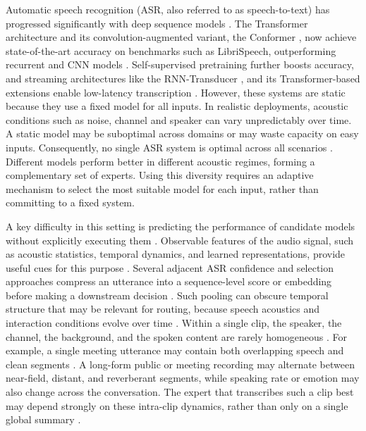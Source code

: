 \documentclass[journal]{IEEEtran}
\begin{document}
Automatic speech recognition (ASR, also referred to as speech-to-text) has progressed significantly with deep sequence models \cite{hinton_deepn,dahl_context,deng_conf}. The Transformer architecture \cite{vaswani2017attention} and its convolution-augmented variant, the Conformer \cite{gulati2020conformer}, now achieve state-of-the-art accuracy on benchmarks such as LibriSpeech, outperforming recurrent and CNN models \cite{deng_conf,bigssl}. Self-supervised pretraining \cite{baevski2020wav2vec,hsu2021hubert,chen2022wavlm} further boosts accuracy, and streaming architectures like the RNN-Transducer \cite{Graves2012SequenceTW}, and its Transformer-based extensions enable low-latency transcription \cite{gong_advanced,lee_mle}. However, these systems are static because they use a fixed model for all inputs. In realistic deployments, acoustic conditions such as noise, channel and speaker can vary unpredictably over time. A static model may be suboptimal across domains or may waste capacity on easy inputs. Consequently, no single ASR system is optimal across all scenarios \cite{li2014overviewrobust,cornell23_chime,cornell24_chime}. Different models perform better in different acoustic regimes, forming a complementary set of experts. Using this diversity requires an adaptive mechanism to select the most suitable model for each input, rather than committing to a fixed system.

A key difficulty in this setting is predicting the performance of candidate models without explicitly executing them \cite{kerschke2019algorithm_selection}. Observable features of the audio signal, such as acoustic statistics, temporal dynamics, and learned representations, provide useful cues for this purpose \cite{baevski2020wav2vec,hsu2021hubert,li2014overviewrobust,bell2021adaptation}. Several adjacent ASR confidence and selection approaches compress an utterance into a sequence-level score or embedding before making a downstream decision \cite{kumar2020utterance_confidence,swarup2019acoustic_hypothesis_embeddings,li2021rebm}. Such pooling can obscure temporal structure that may be relevant for routing, because speech acoustics and interaction conditions evolve over time \cite{li2014overviewrobust,li2023asr_emotional_speech}. Within a single clip, the speaker, the channel, the background, and the spoken content are rarely homogeneous \cite{li2014overviewrobust,bell2021adaptation,cornell23_chime,vinnikov2024notsofar1}. For example, a single meeting utterance may contain both overlapping speech and clean segments \cite{yoshioka2018overlapped_meetings,cornell23_chime,cornell2024chime8,vinnikov2024notsofar1}. A long-form public or meeting recording may alternate between near-field, distant, and reverberant segments, while speaking rate or emotion may also change across the conversation. The expert that transcribes such a clip best may depend strongly on these intra-clip dynamics, rather than only on a single global summary \cite{kumar2020utterance_confidence,li2023asr_emotional_speech}.
\end{document}
